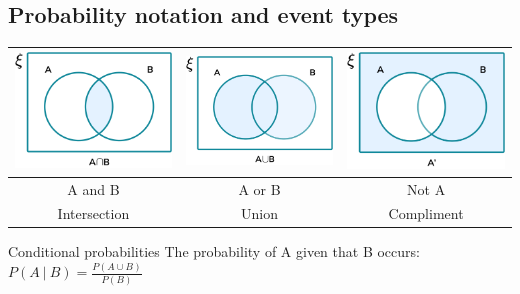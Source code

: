 \documentclass{article}
\begin{document}
\subsection{Probability notation and event types}
\begin{center}
    \begin{table}[H]
        \begin{tabular}{|c|c|c|}
            \hline
            \includegraphics[width=5cm]{IMG/AND.png} & \includegraphics[width=5cm]{IMG/OR.png} & \includegraphics[width=5cm]{IMG/NOT.png} \\
            \hline
            A and B                                  & A or B                                  & Not A                                    \\
            \hline
            Intersection                             & Union                                   & Compliment                               \\
            \hline
        \end{tabular}
    \end{table}
\end{center}
\begin{definition}[]{Conditional probabilities}
    The probability of A given that B occurs: $P(A\ |\ B) = \frac{P(A\cup B)}{P(B)}$
\end{definition}
\end{document}
